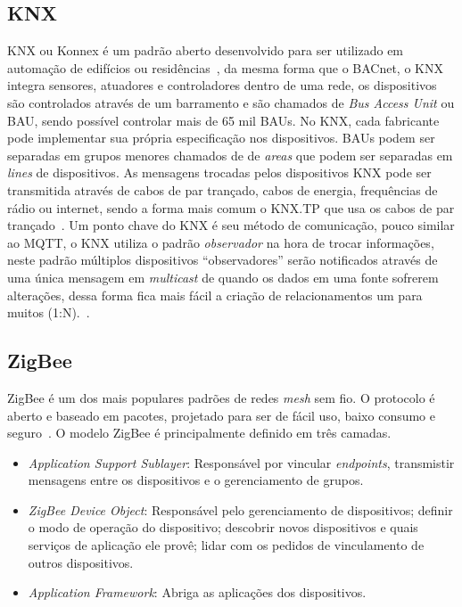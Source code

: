 \subsection{KNX}
KNX ou Konnex é um padrão aberto desenvolvido para ser utilizado em automação de edifícios ou residências~\cite{Sapundzhi2020},
da mesma forma que o BACnet, o KNX integra sensores, atuadores e controladores dentro de uma rede, os dispositivos são controlados
através de um barramento e são chamados de \emph{Bus Access Unit} ou BAU, sendo possível controlar mais de 65 mil BAUs.
No KNX, cada fabricante pode implementar sua própria especificação nos dispositivos. BAUs podem ser separadas em grupos menores
chamados de de \emph{areas} que podem ser separadas em \emph{lines} de dispositivos. As mensagens trocadas pelos dispositivos KNX
pode ser transmitida através de cabos de par trançado, cabos de energia, frequências de rádio ou internet, sendo a forma mais comum o
KNX.TP que usa os cabos de par trançado~\cite{Kraus2020}.
Um ponto chave do KNX é seu método de comunicação, pouco similar ao MQTT, o KNX utiliza o padrão \emph{observador} na hora de trocar informações,
neste padrão múltiplos dispositivos ``observadores'' serão notificados através de uma única mensagem em \emph{multicast}
de quando os dados em uma fonte sofrerem alterações, dessa forma fica mais fácil a criação de relacionamentos um para muitos (1:N).~\cite{Domingues2016}. 

\subsection{ZigBee}
ZigBee é um dos mais populares padrões de redes \emph{mesh} sem fio. O protocolo é aberto e baseado em pacotes, projetado para ser de fácil uso,
baixo consumo e seguro~\cite{tomar2011}.
O modelo ZigBee é principalmente definido em três camadas.
\begin{itemize}
    \item \emph{Application Support Sublayer}: Responsável por vincular \emph{endpoints}, transmistir mensagens entre os dispositivos e o gerenciamento de grupos.
    \item \emph{ZigBee Device Object}: Responsável pelo gerenciamento de dispositivos; definir o modo de operação do dispositivo; descobrir novos dispositivos e quais serviços de aplicação ele provê; lidar com os pedidos de vinculamento de outros dispositivos.
    \item \emph{Application Framework}: Abriga as aplicações dos dispositivos. 
\end{itemize}
~\cite{Domingues2016}

